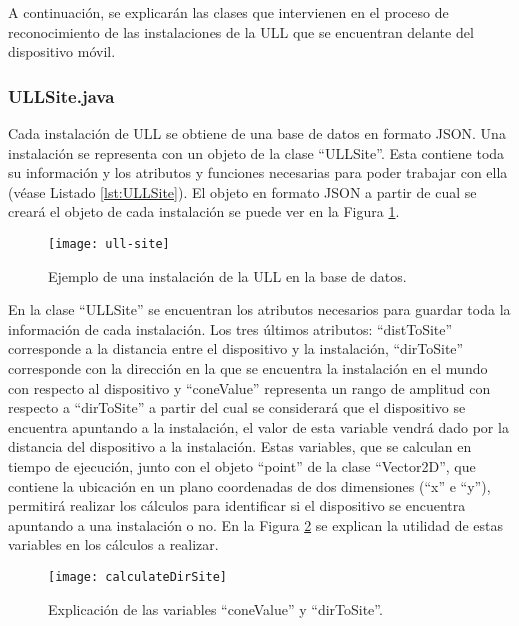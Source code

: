 A continuación, se explicarán las clases que intervienen en el proceso de reconocimiento de las instalaciones de la ULL que se encuentran delante del dispositivo móvil.

\subsubsection{ULLSite.java}

Cada instalación de ULL se obtiene de una base de datos en formato JSON. Una instalación se representa con un objeto de la clase ``ULLSite''. Esta contiene toda su información y los atributos y funciones necesarias para poder trabajar con ella (véase Listado \ref{lst:ULLSite}). El objeto en formato JSON a partir de cual se creará el objeto de cada instalación se puede ver en la Figura \ref{fig:ull-site}.



\begin{figure}[h] 
    \centering
    \texttt{[image: ull-site]}
    \caption{Ejemplo de una instalación de la ULL en la base de datos.}
    \label{fig:ull-site}
\end{figure}

En la clase ``ULLSite'' se encuentran los atributos necesarios para guardar toda la información de cada instalación. Los tres últimos atributos:  ``distToSite'' corresponde a la distancia entre el dispositivo y la instalación, ``dirToSite'' corresponde con la dirección en la que se encuentra la instalación en el mundo con respecto al dispositivo y ``coneValue'' representa un rango de amplitud  con respecto a ``dirToSite'' a partir del cual se considerará que el dispositivo se encuentra apuntando a la instalación, el valor de esta variable vendrá dado por la distancia del dispositivo a la instalación. Estas variables, que se calculan en tiempo de ejecución, junto con el objeto ``point'' de la clase ``Vector2D'', que contiene la ubicación en un plano coordenadas de dos dimensiones (``x'' e ``y''), permitirá realizar los cálculos para identificar si el dispositivo se encuentra apuntando a una instalación o no. En la Figura \ref{fig:dirSite} se explican la utilidad de estas variables en los cálculos a realizar.

\begin{figure}[h] 
    \centering
    \texttt{[image: calculateDirSite]}
    \caption{Explicación de las variables ``coneValue'' y ``dirToSite''.}
    \label{fig:dirSite}
\end{figure}

